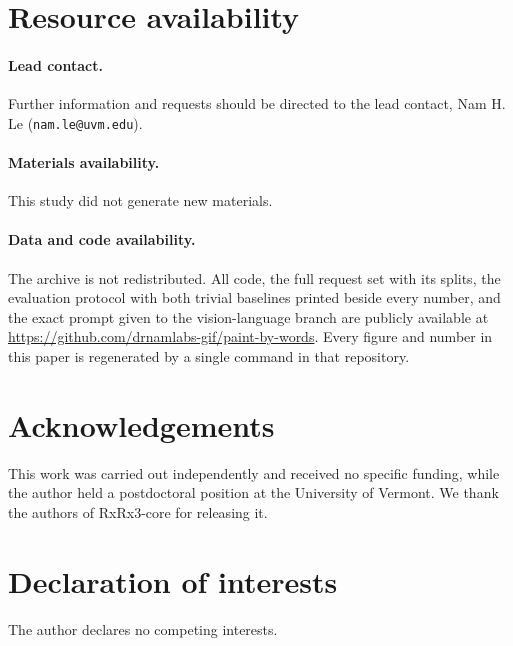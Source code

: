 \documentclass[11pt]{article}
\begin{document}
\section*{Resource availability}

\paragraph{Lead contact.} Further information and requests should be directed to the lead
contact, Nam H. Le (\texttt{nam.le@uvm.edu}).

\paragraph{Materials availability.} This study did not generate new materials.

\paragraph{Data and code availability.} The archive is not redistributed. All code, the full
request set with its splits, the evaluation protocol with both trivial baselines printed
beside every number, and the exact prompt given to the vision-language branch are publicly
available at \url{https://github.com/drnamlabs-gif/paint-by-words}. Every figure and number
in this paper is regenerated by a single command in that repository.

\section*{Acknowledgements}

This work was carried out independently and received no specific funding, while the author
held a postdoctoral position at the University of Vermont. We thank the authors of
RxRx3-core for releasing it.

\section*{Declaration of interests}

The author declares no competing interests.



\end{document}
